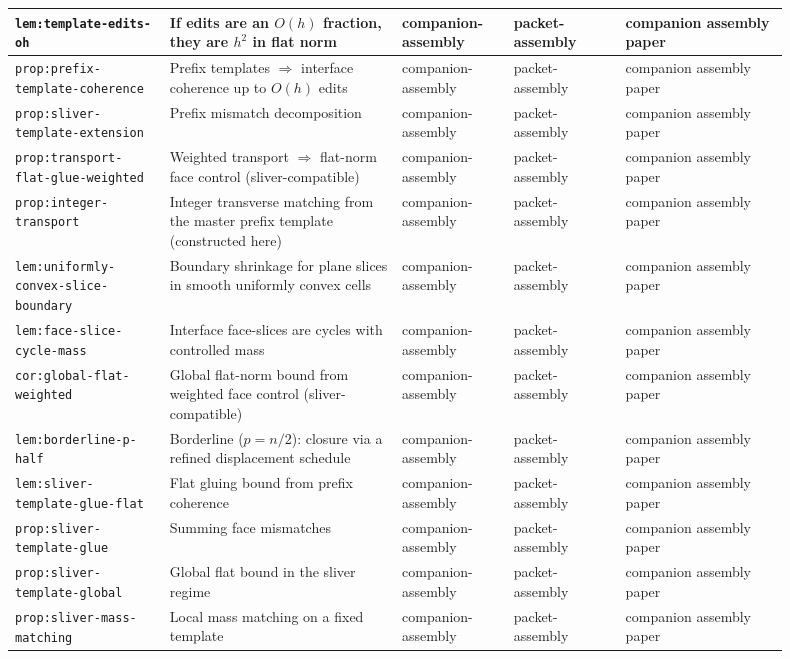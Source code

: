 \documentclass[11pt]{article}
\numberwithin{equation}{section}  %
\theoremstyle{plain}
\theoremstyle{definition}
\theoremstyle{remark}
\begin{document}
\begin{longtable}{|p{0.18\linewidth}|p{0.27\linewidth}|p{0.13\linewidth}|p{0.13\linewidth}|p{0.19\linewidth}|}
\texttt{lem:template-edits-oh} & If edits are an $O(h)$ fraction, they are $h^2$ in flat norm & companion-assembly & packet-assembly & companion assembly paper \\ \hline
\texttt{prop:prefix-template-coherence} & Prefix templates $\Rightarrow$ interface coherence up to $O(h)$ edits & companion-assembly & packet-assembly & companion assembly paper \\ \hline
\texttt{prop:sliver-template-extension} & Prefix mismatch decomposition & companion-assembly & packet-assembly & companion assembly paper \\ \hline
\texttt{prop:transport-flat-glue-weighted} & Weighted transport $\Rightarrow$ flat-norm face control (sliver-compatible) & companion-assembly & packet-assembly & companion assembly paper \\ \hline
\texttt{prop:integer-transport} & Integer transverse matching from the master prefix template (constructed here) & companion-assembly & packet-assembly & companion assembly paper \\ \hline
\texttt{lem:uniformly-convex-slice-boundary} & Boundary shrinkage for plane slices in smooth uniformly convex cells & companion-assembly & packet-assembly & companion assembly paper \\ \hline
\texttt{lem:face-slice-cycle-mass} & {Interface face-slices are cycles with controlled mass} & companion-assembly & packet-assembly & companion assembly paper \\ \hline
\texttt{cor:global-flat-weighted} & Global flat-norm bound from weighted face control (sliver-compatible) & companion-assembly & packet-assembly & companion assembly paper \\ \hline
\texttt{lem:borderline-p-half} & Borderline ($p=n/2$): closure via a refined displacement schedule & companion-assembly & packet-assembly & companion assembly paper \\ \hline
\texttt{lem:sliver-template-glue-flat} & Flat gluing bound from prefix coherence & companion-assembly & packet-assembly & companion assembly paper \\ \hline
\texttt{prop:sliver-template-glue} & Summing face mismatches & companion-assembly & packet-assembly & companion assembly paper \\ \hline
\texttt{prop:sliver-template-global} & Global flat bound in the sliver regime & companion-assembly & packet-assembly & companion assembly paper \\ \hline
\texttt{prop:sliver-mass-matching} & Local mass matching on a fixed template & companion-assembly & packet-assembly & companion assembly paper \\ \hline

\end{longtable}
\end{document}
